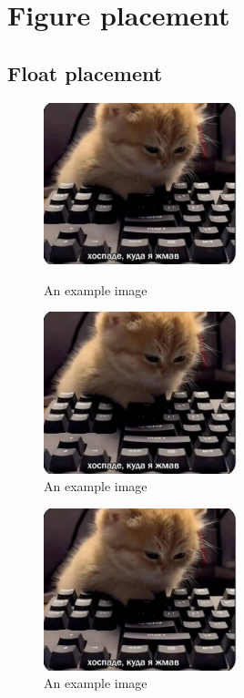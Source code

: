 \documentclass{article}
\begin{document}
\section{Figure placement}\label{sec}

\subsection{Float placement}\label{subsec}

\lipsum[1-4]

\begin{figure}[ht]
    \centering
    \includegraphics[width=0.5\textwidth]{mem}
    \label{fig:label_before_fig_caption}\caption{An example image}
\end{figure}

\lipsum[5-8]

\begin{figure}[b!]
    \centering
    \includegraphics[width=0.5\textwidth]{mem}
    \caption{An example image\label{fig:label_inside_fig_caption}}
\end{figure}

\lipsum[9-16]

\begin{figure}[H]
    \centering
    \includegraphics[width=0.5\textwidth]{mem}
    \caption{An example image}\label{fig:label_after_fig_caption}
\end{figure}
\end{document}
